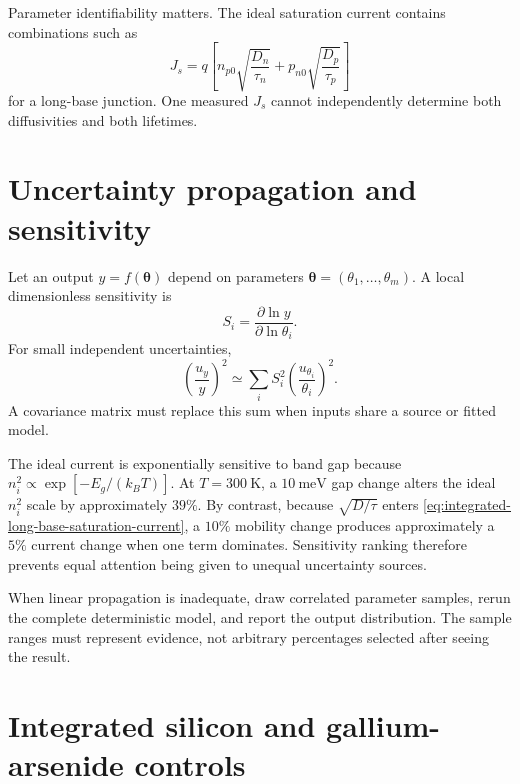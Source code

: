 Parameter identifiability matters.  The ideal saturation current contains
combinations such as
\begin{equation}
 J_s=q\left[
 n_{p0}\sqrt{\frac{D_n}{\tau_n}}
 +p_{n0}\sqrt{\frac{D_p}{\tau_p}}
 \right]
 \label{eq:integrated-long-base-saturation-current}
\end{equation}
for a long-base junction.  One measured $J_s$ cannot independently determine
both diffusivities and both lifetimes.

\section{Uncertainty propagation and sensitivity}

Let an output $y=f(\bm\theta)$ depend on parameters
$\bm\theta=(\theta_1,\ldots,\theta_m)$.  A local dimensionless sensitivity is
\begin{equation}
 S_i=\frac{\partial\ln y}{\partial\ln\theta_i}.
 \label{eq:local-log-sensitivity}
\end{equation}
For small independent uncertainties,
\begin{equation}
 \left(\frac{u_y}{y}\right)^2
 \simeq\sum_i S_i^2
 \left(\frac{u_{\theta_i}}{\theta_i}\right)^2.
 \label{eq:first-order-uncertainty}
\end{equation}
A covariance matrix must replace this sum when inputs share a source or fitted
model.

The ideal current is exponentially sensitive to band gap because
$n_i^2\propto\exp[-E_g/(k_BT)]$.  At
$T=\SI{300}{\kelvin}$, a
$\SI{10}{\milli\electronvolt}$ gap change alters the ideal $n_i^2$ scale by
approximately $39\%$.  By contrast, because
$\sqrt{D/\tau}$ enters \cref{eq:integrated-long-base-saturation-current}, a
$10\%$ mobility change produces approximately a $5\%$ current change when one
term dominates.  Sensitivity ranking therefore prevents equal attention being
given to unequal uncertainty sources.

When linear propagation is inadequate, draw correlated parameter samples,
rerun the complete deterministic model, and report the output distribution.
The sample ranges must represent evidence, not arbitrary percentages selected
after seeing the result.

\section{Integrated silicon and gallium-arsenide controls}


